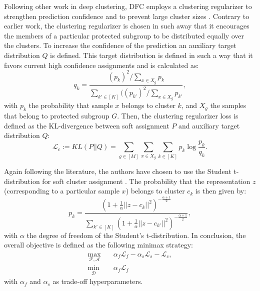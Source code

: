 Following other work in deep clustering, DFC employs a clustering regularizer to strengthen prediction confidence and to prevent large cluster sizes \citep{Li_2020_CVPR}. Contrary to earlier work, the clustering regularizer is chosen in such away that it encourages the members of a particular protected subgroup to be distributed equally over the clusters. To increase the confidence of the prediction an auxiliary target distribution $Q$ is defined. This target distribution is defined in such a way that it favors current high confidence assignments and is calculated as:
\begin{equation}
    q_k = \frac{(p_k)^2/\sum_{x\in X_g} p_k}{\sum_{k'\in [K]} ((p_{k'})^2/\sum_{x\in X_g} p_{k'}},
    \label{eq:qk}
\end{equation}
with $p_k$ the probability that sample $x$ belongs to cluster $k$, and $X_g$ the samples that belong to protected subgroup $G$. Then, the clustering regularizer loss is defined as the KL-divergence between soft assignment $P$ and auxiliary target distribution $Q$:
\begin{equation}
    \mathcal{L}_c:= KL(P||Q)=\sum_{g\in [M]}\sum_{x\in X_g}\sum_{k\in[K]}p_k \log \frac{p_k}{q_k}.
    \label{eq:KL}
\end{equation}

Again following the literature, the authors have chosen to use the Student t-distribution for soft cluster assignment \citep{Li_2020_CVPR}. The probability that the representation $z$ (corresponding to a particular sample $x$) belongs to cluster $c_k$ is then given by:
\begin{equation}
    p_k = \frac{(1+\frac{1}{\alpha}||z-c_k||^2)^{-\frac{\alpha+1}{2}}}{\sum_{k'\in [K]}(1+\frac{1}{\alpha}||z-c_{k'}||^2)^{-\frac{\alpha+1}{2}}},
    \label{eq:student-t}
\end{equation}
with $\alpha$ the degree of freedom of the Student's t-distribution. In conclusion, the overall objective is defined as the following minimax strategy:
\begin{align}
    \max_{\mathcal{F}, \mathcal{A}}\quad& \alpha_f \mathcal{L}_f -\alpha_s \mathcal{L}_s-\mathcal{L}_c,\\
    \min_{\mathcal{D}}\quad& \alpha_f\mathcal{L}_f
    \label{eq:objective}
\end{align}
with $\alpha_f$ and $\alpha_s$ as trade-off hyperparameters.






